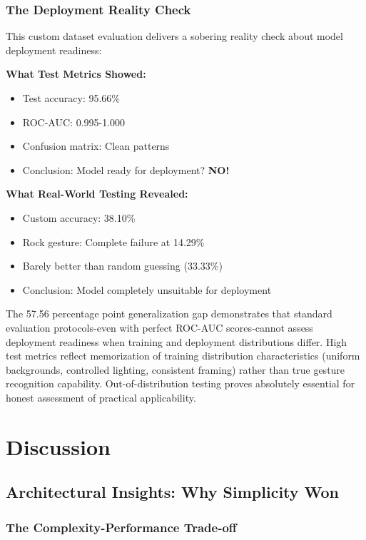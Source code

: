 \documentclass[12pt,a4paper]{article}
\begin{document}
\subsubsection{The Deployment Reality Check}

This custom dataset evaluation delivers a sobering reality check about model deployment readiness:

\textbf{What Test Metrics Showed:}
\begin{itemize}
    \item Test accuracy: 95.66\%
    \item ROC-AUC: 0.995-1.000
    \item Confusion matrix: Clean patterns
    \item Conclusion: Model ready for deployment? \textbf{NO!}
\end{itemize}

\textbf{What Real-World Testing Revealed:}
\begin{itemize}
    \item Custom accuracy: 38.10\%
    \item Rock gesture: Complete failure at 14.29\%
    \item Barely better than random guessing (33.33\%)
    \item Conclusion: Model completely unsuitable for deployment
\end{itemize}

The 57.56 percentage point generalization gap demonstrates that standard evaluation protocols-even with perfect ROC-AUC scores-cannot assess deployment readiness when training and deployment distributions differ. High test metrics reflect memorization of training distribution characteristics (uniform backgrounds, controlled lighting, consistent framing) rather than true gesture recognition capability. Out-of-distribution testing proves absolutely essential for honest assessment of practical applicability.

\section{Discussion}

\subsection{Architectural Insights: Why Simplicity Won}

\subsubsection{The Complexity-Performance Trade-off}
\end{document}
